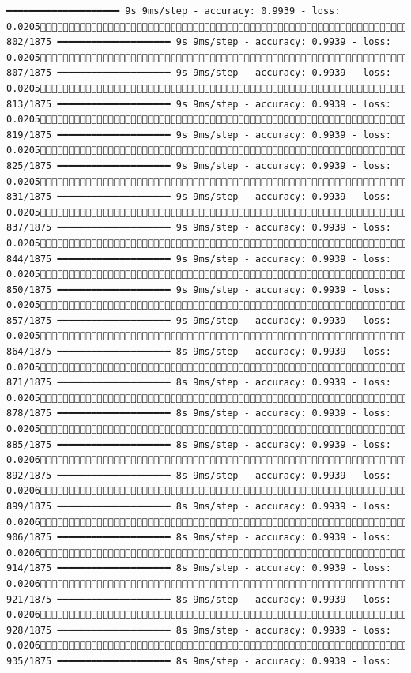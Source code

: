 \documentclass[
  letterpaper,
  DIV=11,
  numbers=noendperiod]{scrreprt}
\begin{document}
\begin{verbatim}
━━━━━━━━━━━━━━━━━━━━ 9s 9ms/step - accuracy: 0.9939 - loss: 0.0205 802/1875 ━━━━━━━━━━━━━━━━━━━━ 9s 9ms/step - accuracy: 0.9939 - loss: 0.0205 807/1875 ━━━━━━━━━━━━━━━━━━━━ 9s 9ms/step - accuracy: 0.9939 - loss: 0.0205 813/1875 ━━━━━━━━━━━━━━━━━━━━ 9s 9ms/step - accuracy: 0.9939 - loss: 0.0205 819/1875 ━━━━━━━━━━━━━━━━━━━━ 9s 9ms/step - accuracy: 0.9939 - loss: 0.0205 825/1875 ━━━━━━━━━━━━━━━━━━━━ 9s 9ms/step - accuracy: 0.9939 - loss: 0.0205 831/1875 ━━━━━━━━━━━━━━━━━━━━ 9s 9ms/step - accuracy: 0.9939 - loss: 0.0205 837/1875 ━━━━━━━━━━━━━━━━━━━━ 9s 9ms/step - accuracy: 0.9939 - loss: 0.0205 844/1875 ━━━━━━━━━━━━━━━━━━━━ 9s 9ms/step - accuracy: 0.9939 - loss: 0.0205 850/1875 ━━━━━━━━━━━━━━━━━━━━ 9s 9ms/step - accuracy: 0.9939 - loss: 0.0205 857/1875 ━━━━━━━━━━━━━━━━━━━━ 9s 9ms/step - accuracy: 0.9939 - loss: 0.0205 864/1875 ━━━━━━━━━━━━━━━━━━━━ 8s 9ms/step - accuracy: 0.9939 - loss: 0.0205 871/1875 ━━━━━━━━━━━━━━━━━━━━ 8s 9ms/step - accuracy: 0.9939 - loss: 0.0205 878/1875 ━━━━━━━━━━━━━━━━━━━━ 8s 9ms/step - accuracy: 0.9939 - loss: 0.0205 885/1875 ━━━━━━━━━━━━━━━━━━━━ 8s 9ms/step - accuracy: 0.9939 - loss: 0.0206 892/1875 ━━━━━━━━━━━━━━━━━━━━ 8s 9ms/step - accuracy: 0.9939 - loss: 0.0206 899/1875 ━━━━━━━━━━━━━━━━━━━━ 8s 9ms/step - accuracy: 0.9939 - loss: 0.0206 906/1875 ━━━━━━━━━━━━━━━━━━━━ 8s 9ms/step - accuracy: 0.9939 - loss: 0.0206 914/1875 ━━━━━━━━━━━━━━━━━━━━ 8s 9ms/step - accuracy: 0.9939 - loss: 0.0206 921/1875 ━━━━━━━━━━━━━━━━━━━━ 8s 9ms/step - accuracy: 0.9939 - loss: 0.0206 928/1875 ━━━━━━━━━━━━━━━━━━━━ 8s 9ms/step - accuracy: 0.9939 - loss: 0.0206 935/1875 ━━━━━━━━━━━━━━━━━━━━ 8s 9ms/step - accuracy: 0.9939 - loss: 
\end{verbatim}
\end{document}
